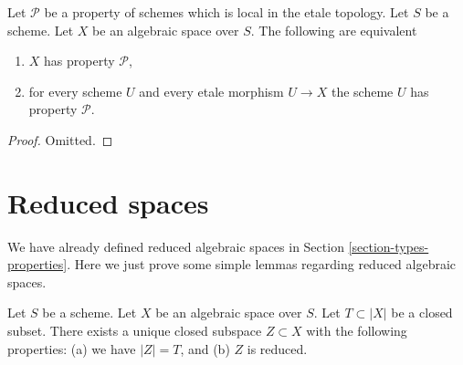 \begin{lemma}
\label{lemma-type-property}
Let $\mathcal{P}$ be a property of schemes which is 
local in the etale topology.
Let $S$ be a scheme.
Let $X$ be an algebraic space over $S$.
The following are equivalent
\begin{enumerate}
\item $X$ has property $\mathcal{P}$,
\item for every scheme $U$ and every etale morphism $U \to X$
the scheme $U$ has property $\mathcal{P}$.
\end{enumerate}
\end{lemma}

\begin{proof}
Omitted.
\end{proof}






\section{Reduced spaces}
\label{section-reduced}

\noindent
We have already defined reduced algebraic spaces in
Section \ref{section-types-properties}.
Here we just prove some simple lemmas regarding reduced algebraic
spaces.

\begin{lemma}
\label{lemma-reduced-closed-subspace}
Let $S$ be a scheme.
Let $X$ be an algebraic space over $S$.
Let $T \subset |X|$ be a closed subset.
There exists a unique closed subspace $Z \subset X$ with
the following properties: (a) we have $|Z| = T$, and (b) $Z$ is reduced.
\end{lemma}

